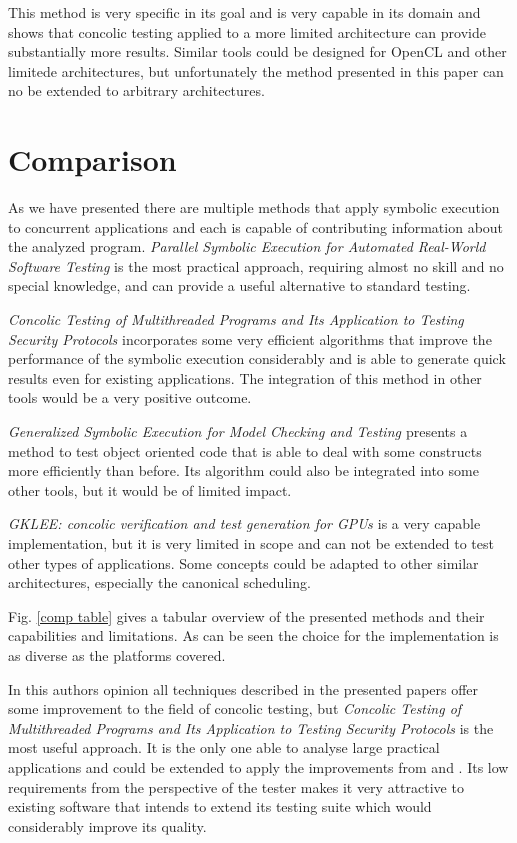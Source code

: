 \documentclass[10pt]{llncs}
\begin{document}
This method is very specific in its goal and is very capable in its domain and shows that concolic testing applied to a more limited architecture can provide substantially more results. Similar tools could be designed for OpenCL and other limitede architectures, but unfortunately the method presented in this paper can no be extended to arbitrary architectures.

\section{Comparison}
\label{comparison}

As we have presented there are multiple methods that apply symbolic execution to concurrent applications and each is capable of contributing information about the analyzed program. \emph{Parallel Symbolic Execution for Automated Real-World Software Testing} \cite{base3} is the most practical approach, requiring almost no skill and no special knowledge, and can provide a useful alternative to standard testing.

\emph{Concolic Testing of Multithreaded Programs and Its Application to Testing Security Protocols} \cite{base4} incorporates some very efficient algorithms that improve the performance of the symbolic execution considerably and is able to generate quick results even for existing applications. The integration of this method in other tools would be a very positive outcome.

\emph{Generalized Symbolic Execution for Model Checking and Testing \cite{base5}} presents a method to test object oriented code that is able to deal with some constructs more efficiently than before. Its algorithm could also be integrated into some other tools, but it would be of limited impact.

\emph{GKLEE: concolic verification and test generation for GPUs \cite{base7}} is a very capable implementation, but it is very limited in scope and can not be extended to test other types of applications. Some concepts could be adapted to other similar architectures, especially the canonical scheduling.

Fig. \ref{comp table} gives a tabular overview of the presented methods and their capabilities and limitations. As can be seen the choice for the implementation is as diverse as the platforms covered.

In this authors opinion all techniques described in the presented papers offer some improvement to the field of concolic testing, but \emph{Concolic Testing of Multithreaded Programs and Its Application to Testing Security Protocols} is the most useful approach. It is the only one able to analyse large practical applications and could be extended to apply the improvements from \cite{base4} and \cite{base5}. Its low requirements from the perspective of the tester makes it very attractive to existing software that intends to extend its testing suite which would considerably improve its quality.
\end{document}
